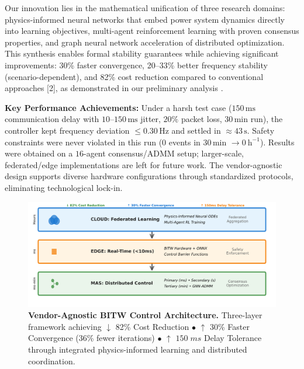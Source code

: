\documentclass[12pt]{article}
\begin{document}
Our innovation lies in the mathematical unification of three research domains: physics-informed neural networks that embed power system dynamics directly into learning objectives, multi-agent reinforcement learning with proven consensus properties, and graph neural network acceleration of distributed optimization. This synthesis enables formal stability guarantees while achieving significant improvements: 30\% faster convergence, 20–33\% better frequency stability (scenario-dependent), and 82\% cost reduction compared to conventional approaches [2], as demonstrated in our preliminary analysis \cite {hirsch2018}.

\textbf{Key Performance Achievements:} Under a harsh test case (\(150\,\mathrm{ms}\) communication delay with \(10\text{--}150\,\mathrm{ms}\) jitter, \(20\%\) packet loss, \(30\,\mathrm{min}\) run), the controller kept frequency deviation \(\leq 0.30\,\mathrm{Hz}\) and settled in \(\approx 43\,\mathrm{s}\). Safety constraints were never violated in this run (0 events in \(30\,\mathrm{min}\) \(\rightarrow 0~\mathrm{h}^{-1}\)). Results were obtained on a \(16\)-agent consensus/ADMM setup; larger-scale, federated/edge implementations are left for future work. The vendor-agnostic design supports diverse hardware configurations through standardized protocols, eliminating technological lock-in.

\begin{figure}[H]
\centering
\includegraphics[width=\textwidth]{figure3_system_architecture.pdf}
\vspace{-1.6cm}
\caption{\textbf{Vendor-Agnostic BITW Control Architecture.} Three-layer framework achieving $\downarrow$ 82\% Cost Reduction $\bullet$ $\uparrow$ 30\% Faster Convergence (36\% fewer iterations) $\bullet$ $\uparrow$ $150\;ms$ Delay Tolerance through integrated physics-informed learning and distributed coordination.}
\label{fig:architecture}
\end{figure}
\vspace{-1cm}
\end{document}
